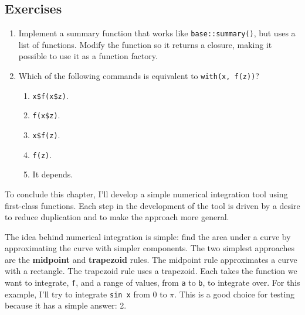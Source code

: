 \subsection{Exercises}

\begin{enumerate}
\def\labelenumi{\arabic{enumi}.}
\item
  Implement a summary function that works like \texttt{base::summary()},
  but uses a list of functions. Modify the function so it returns a
  closure, making it possible to use it as a function factory.
\item
  Which of the following commands is equivalent to
  \texttt{with(x, f(z))}?

  \begin{enumerate}
  \def\labelenumii{(\alph{enumii})}
  \itemsep1pt\parskip0pt
  \item
    \texttt{x\$f(x\$z)}.
  \item
    \texttt{f(x\$z)}.
  \item
    \texttt{x\$f(z)}.
  \item
    \texttt{f(z)}.
  \item
    It depends.
  \end{enumerate}
\end{enumerate}


To conclude this chapter, I'll develop a simple numerical integration
tool using first-class functions. Each step in the development of the
tool is driven by a desire to reduce duplication and to make the
approach more general. 

The idea behind numerical integration is simple: find the area under a
curve by approximating the curve with simpler components. The two
simplest approaches are the \textbf{midpoint} and \textbf{trapezoid}
rules. The midpoint rule approximates a curve with a rectangle. The
trapezoid rule uses a trapezoid. Each takes the function we want to
integrate, \texttt{f}, and a range of values, from \texttt{a} to
\texttt{b}, to integrate over. For this example, I'll try to integrate
\texttt{sin x} from 0 to \(\pi\). This is a good choice for testing
because it has a simple answer: 2.


